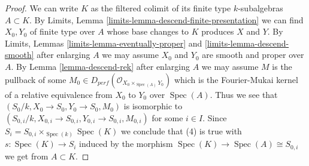 \documentclass{stacks-project}
\theoremstyle{plain}
\theoremstyle{definition}
\theoremstyle{remark}
\numberwithin{equation}{subsection}
\def\Spec{\mathop{\mathrm{Spec}}}
\begin{document}
\begin{proof}
\medskip\noindent
We can write $K$ as the filtered colimit of its finite type
$k$-subalgebras $A \subset K$. By
Limits, Lemma \ref{limits-lemma-descend-finite-presentation}
we can find $X_0, Y_0$ of finite type over $A$ whose
base changes to $K$ produces $X$ and $Y$.
By Limits, Lemmas
\ref{limits-lemma-eventually-proper} and \ref{limits-lemma-descend-smooth}
after enlarging $A$ we may assume $X_0$ and $Y_0$
are smooth and proper over $A$.
By Lemma \ref{lemma-descend-rek}
after enlarging $A$ we may assume $M$ is the pullback of
some $M_0  \in D_{perf}(\mathcal{O}_{X_0 \times_{\Spec(A)} Y_0})$
which is the Fourier-Mukai kernel of a relative equivalence
from $X_0$ to $Y_0$ over $\Spec(A)$.
Thus we see that $(S_0/k, X_0 \to S_0, Y_0 \to S_0, M_0)$
is isomorphic to
$(S_{0, i}/k, X_{0, i} \to S_{0, i}, Y_{0, i} \to S_{0, i}, M_{0, i})$
for some $i \in I$.
Since $S_i = S_{0, i} \times_{\Spec(k)} \Spec(K)$
we conclude that (4) is true with $s : \Spec(K) \to S_i$
induced by the morphism $\Spec(K) \to \Spec(A) \cong S_{0, i}$
we get from $A \subset K$.
\end{proof}
\end{document}
